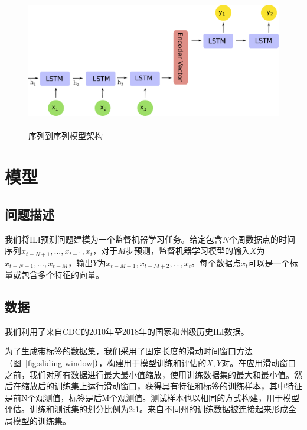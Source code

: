 \begin{figure}
\centering
\includegraphics[width=12cm,height=6cm,keepaspectratio]{seq2seq.pdf}
\caption{序列到序列模型架构}
\label{fig:seq2seq}
\end{figure}
    
    
    \section{模型}
    \subsection{问题描述}
    我们将ILI预测问题建模为一个监督机器学习任务。给定包含$N$个周数据点的时间序列${x_{t-N+1}, ..., x_{t-1}, x_t}$，对于$M$步预测，监督机器学习模型的输入$X$为${x_{t-N+1}, ..., x_{t-M}}$，输出$Y$为${x_{t-M+1}, x_{t-M+2}, ..., x_t}$。每个数据点$x_t$可以是一个标量或包含多个特征的向量。
 
    \subsection{数据}
我们利用了来自CDC的2010年至2018年的国家和州级历史ILI数据。

为了生成带标签的数据集，我们采用了固定长度的滑动时间窗口方法（图~\ref{fig:sliding-window}），构建用于模型训练和评估的${X, Y}$对。在应用滑动窗口之前，我们对所有数据进行最大最小值缩放，使用训练数据集的最大和最小值。然后在缩放后的训练集上运行滑动窗口，获得具有特征和标签的训练样本，其中特征是前N个观测值，标签是后M个观测值。测试样本也以相同的方式构建，用于模型评估。训练和测试集的划分比例为2:1。来自不同州的训练数据被连接起来形成全局模型的训练集。

